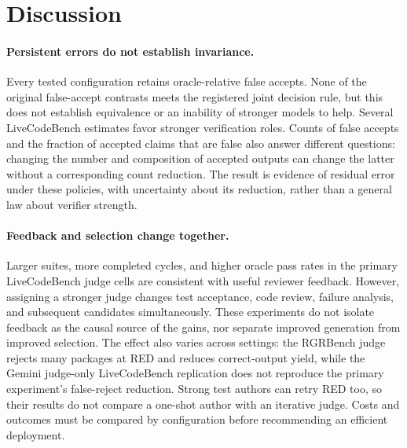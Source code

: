 \section{Discussion}
\label{sec:discussion}

\paragraph{Persistent errors do not establish invariance.} Every tested configuration retains
oracle-relative false accepts. None of the original false-accept contrasts meets the registered
joint decision rule, but this does not establish equivalence or an inability of stronger models
to help. Several LiveCodeBench estimates favor stronger verification roles. Counts of false
accepts and the fraction of accepted claims that are false also answer different questions:
changing the number and composition of accepted outputs can change the latter without a
corresponding count reduction. The result is evidence of residual error under these policies,
with uncertainty about its reduction, rather than a general law about verifier strength.

\paragraph{Feedback and selection change together.} Larger suites, more completed cycles, and
higher oracle pass rates in the primary LiveCodeBench judge cells are consistent with useful
reviewer feedback. However, assigning a stronger judge changes test acceptance, code review,
failure analysis, and subsequent candidates simultaneously. These experiments do not isolate
feedback as the causal source of the gains, nor separate improved generation from improved
selection. The effect also varies across settings: the RGRBench judge rejects many packages at
RED and reduces correct-output yield, while the Gemini judge-only LiveCodeBench replication does
not reproduce the primary experiment's false-reject reduction. Strong test authors can retry
RED too, so their results do not compare a one-shot author with an iterative judge. Costs and
outcomes must be compared by configuration before recommending an efficient deployment.

